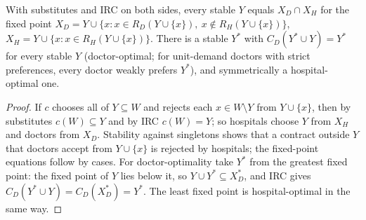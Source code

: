 \begin{theorem}
\label{thm:hm-optimal}
\leanok
{}
With substitutes and IRC on both sides, every stable $Y$ equals $X_D \cap X_H$ for the fixed point
$X_D = Y \cup \{x : x \in R_D(Y \cup \{x\}),\ x \notin R_H(Y \cup \{x\})\}$, $X_H = Y \cup \{x : x \in R_H(Y \cup \{x\})\}$.
There is a stable $Y^*$ with $C_D(Y^* \cup Y) = Y^*$ for every stable $Y$ (doctor-optimal; for unit-demand doctors with
strict preferences, every doctor weakly prefers $Y^*$), and symmetrically a hospital-optimal one.
\end{theorem}
\begin{proof}
\leanok
If $c$ chooses all of $Y \subseteq W$ and rejects each $x \in W \setminus Y$ from $Y \cup \{x\}$, then by substitutes $c(W)
\subseteq Y$ and by IRC $c(W) = Y$; so hospitals choose $Y$ from $X_H$ and doctors from $X_D$. Stability against
singletons shows that a contract outside $Y$ that doctors accept from $Y \cup \{x\}$ is rejected by hospitals; the
fixed-point equations follow by cases. For doctor-optimality take $Y^*$ from the greatest fixed point: the fixed point
of $Y$ lies below it, so $Y \cup Y^* \subseteq X_D^*$, and IRC gives $C_D(Y^* \cup Y) = C_D(X_D^*) = Y^*$. The least
fixed point is hospital-optimal in the same way.
\end{proof}
